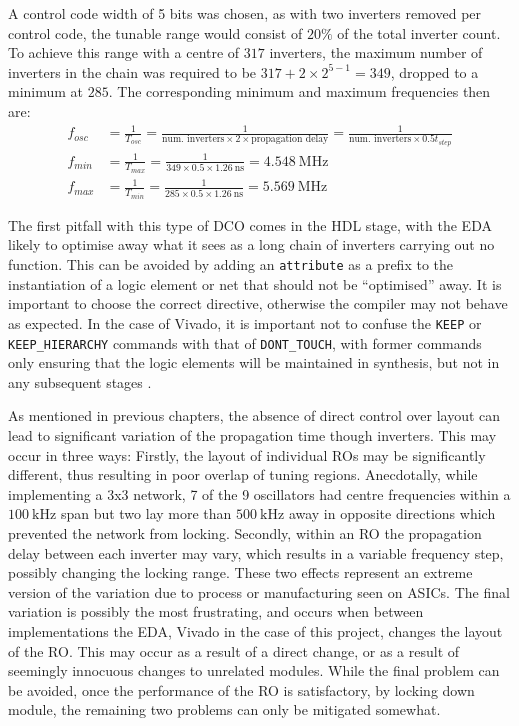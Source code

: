 A control code width of 5 bits was chosen, as with two inverters removed per control code, the tunable range would consist of $20\%$ of the total inverter count. To achieve this range with a centre of $317$ inverters, the maximum number of inverters in the chain was required to be $317+2\times 2^{5-1} = 349$, dropped to a minimum at $285$. The corresponding minimum and maximum frequencies then are:
\begin{align}
f_{osc} &= \frac{1}{T_{osc}} = \frac{1}{\text{num. inverters}\times 2\times\text{propagation delay}} = \frac{1}{\text{num. inverters}\times 0.5t_{step}} \\
f_{min} &= \frac{1}{T_{max}} = \frac{1}{349\times 0.5\times1.26~\si{\nano\second}} = 4.548~\si{\mega\hertz} \\
f_{max} &= \frac{1}{T_{min}} = \frac{1}{285\times 0.5\times1.26~\si{\nano\second}} = 5.569~\si{\mega\hertz}
\end{align}

The first pitfall with this type of \ac{DCO} comes in the \ac{HDL} stage, with the \ac{EDA} likely to optimise away what it sees as a long chain of inverters carrying out no function. This can be avoided by adding an \texttt{attribute} as a prefix to the instantiation of a logic element or net that should not be ``optimised'' away. It is important to choose the correct directive, otherwise the compiler may not behave as expected. In the case of Vivado, it is important not to confuse the \texttt{KEEP} or \texttt{KEEP\_HIERARCHY} commands with that of \texttt{DONT\_TOUCH}, with former commands only ensuring that the logic elements will be maintained in synthesis, but not in any subsequent stages \cite{synth_ug}.

As mentioned in previous chapters, the absence of direct control over layout can lead to significant variation of the propagation time though inverters. This may occur in three ways: Firstly, the layout of individual \ac{RO}s may be significantly different, thus resulting in poor overlap of tuning regions. Anecdotally, while implementing a 3x3 network, 7 of the 9 oscillators had centre frequencies within a $100~\si{\kilo\hertz}$ span but two lay more than $500~\si{\kilo\hertz}$ away in opposite directions which prevented the network from locking. Secondly, within an \ac{RO} the propagation delay between each inverter may vary, which results in a variable frequency step, possibly changing the locking range. These two effects represent an extreme version of the variation due to process or manufacturing seen on \ac{ASIC}s. The final variation is possibly the most frustrating, and occurs when between implementations the \ac{EDA}, Vivado in the case of this project, changes the layout of the \ac{RO}. This may occur as a result of a direct change, or as a result of seemingly innocuous changes to unrelated modules. While the final problem can be avoided, once the performance of the \ac{RO} is satisfactory, by locking down module, the remaining two problems can only be mitigated somewhat.

